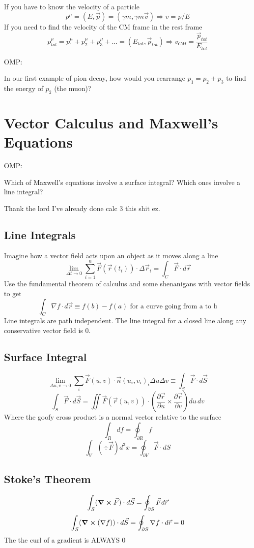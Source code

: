 \documentclass{report}
\newcommand{\del}{\partial}
\newcommand{\pdif}[2]{ \frac{\partial #1}{ \partial #2} }
\begin{document}
If you have to know the velocity of a particle
\[
p^\mu = (E, \vec{p}) = (\gamma m, \gamma m \vec{v})
\Longrightarrow
v = p/E
\]
If you need to find the velocity of the CM frame in the rest frame
\[
p^\mu_{tot} = p^\mu_1 + p^\mu_2 + p^\mu_3 + \ldots = (E_{tot}, \vec{p}_{tot})
\Longrightarrow
v_{CM} = \frac{\vec{p}_{tot}}{E_{tot}}
\]

OMP:

In our first example of pion decay, how would you rearrange $p_1 = p_2 + p_3$ to find the energy of $p_2$ (the muon)?



\chapter{Vector Calculus and Maxwell's Equations}
OMP:

Which of Maxwell's equations involve a surface integral? Which ones involve a line integral?


Thank the lord I've already done calc 3 this shit ez.

\section{Line Integrals}
Imagine how a vector field acts upon an object as it moves along a line
\[
\lim_{\Delta t \to 0} \sum^{n}_{i = 1} \vec{F}(\vec{r}(t_i)) \cdot \Delta \vec{r}_i
=
\int_C \vec{F} \cdot d\vec{r}
\]
Use the fundamental theorem of calculus and some shenanigans with vector fields to get
\[
\int_C \nabla f \cdot d\vec{r}
\equiv
f(b) - f(a)
\textrm{ for a curve going from a to b}
\]
Line integrals are path independent. The line integral for a closed line along any conservative vector field is 0.

\section{Surface Integral}
\[
\lim_{\Delta u, v  \to 0} \sum^{}_{i} \vec{F}(u, v) \cdot \vec{n}(u_i, v_i)_i \Delta u \Delta v
\equiv
\int_S \vec{F} \cdot d\vec{S}
\]
\[
\int_S \vec{F} \cdot d\vec{S}
=
\iint
\vec{F}(\vec{r}(u, v)) 
\cdot
\left(
\pdif{\vec{r}}{u}
\times 
\pdif{\vec{r}}{v}
\right)
du \, dv
\]
Where the goofy cross product is a normal vector relative to the surface
\[
\int_R df = \oint_{\partial R} f
\]
\[
\int_V (\div \vec{F})d^3x
=
\oint_{\del V} \vec{F} \cdot dS
\]
\section{Stoke's Theorem}
\[
\int_S (\curl \vec{F}) \cdot d\vec{S}
 = 
 \oint_{\del S} \vec{F} d\vec{r}
\]
\[
\int_S (\curl (\nabla f)) \cdot d\vec{S} 
=
 \oint_{\del S} \nabla f \cdot d\vec{r} = 0
\]
The the curl of a gradient is ALWAYS 0
\end{document}
